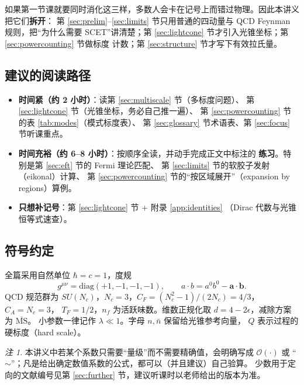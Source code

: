 \documentclass[UTF8,a4paper,11pt]{ctexart}
\theoremstyle{definition}
\theoremstyle{remark}
\newtheorem{remark}{注}[section]
\theoremstyle{plain}
\newcommand{\CF}{C_F}
\newcommand{\CA}{C_A}
\newcommand{\TF}{T_F}
\newcommand{\muMS}{\overline{\mathrm{MS}}}
\newcommand{\en}[1]{\textsf{#1}}   %
\begin{document}
如果第一节课就要同时消化这三样，多数人会卡在记号上而错过物理。因此本讲义把它们\textbf{拆开}：
第 \ref{sec:prelim}--\ref{sec:limits} 节只用普通的四动量与 QCD Feynman 规则，把“为什么需要
SCET”讲清楚；第 \ref{sec:lightcone} 节才引入光锥坐标；第 \ref{sec:powercounting} 节做标度
计数；第 \ref{sec:structure} 节才写下有效拉氏量。

\subsection*{建议的阅读路径}

\begin{itemize}
  \item \textbf{时间紧（约 2 小时）}：读第 \ref{sec:multiscale} 节（多标度问题）、
        第 \ref{sec:lightcone} 节（光锥坐标，务必自己推一遍）、
        第 \ref{sec:powercounting} 节的表 \ref{tab:modes}（模式标度表）、
        第 \ref{sec:glossary} 节术语表、第 \ref{sec:focus} 节听课重点。
  \item \textbf{时间充裕（约 6--8 小时）}：按顺序全读，并动手完成正文中标注的
        \textbf{练习}。特别是第 \ref{sec:eft} 节的 Fermi 理论匹配、
        第 \ref{sec:limits} 节的软胶子发射（\en{eikonal}）计算、
        第 \ref{sec:powercounting} 节的“按区域展开”（\en{expansion by regions}）算例。
  \item \textbf{只想补记号}：第 \ref{sec:lightcone} 节 $+$ 附录 \ref{app:identities}
        （Dirac 代数与光锥恒等式速查）。
\end{itemize}

\subsection*{符号约定}

全篇采用自然单位 $\hbar=c=1$，度规
\begin{equation}
  g^{\mu\nu}=\mathrm{diag}(+1,-1,-1,-1),
  \qquad
  a\cdot b = a^0b^0-\bm a\cdot\bm b .
\end{equation}
QCD 规范群为 $SU(N_c)$，$N_c=3$，$\CF=(N_c^2-1)/(2N_c)=4/3$，$\CA=N_c=3$，
$\TF=1/2$，$n_f$ 为活跃味数。维数正规化取 $d=4-2\epsilon$，减除方案为 $\muMS$。
小参数一律记作 $\lambda\ll1$。字母 $n,\bar n$ 保留给光锥参考向量，
$Q$ 表示过程的硬标度（\en{hard scale}）。

\begin{remark}
本讲义中若某个系数只需要“量级”而不需要精确值，会明确写成 $\mathcal O(\cdot)$ 或
“$\sim$”；凡是给出确定数值系数的公式，都可以（并且建议）自己验算。
少数用于定向的文献编号见第 \ref{sec:further} 节，建议听课时以老师给出的版本为准。
\end{remark}
\end{document}

